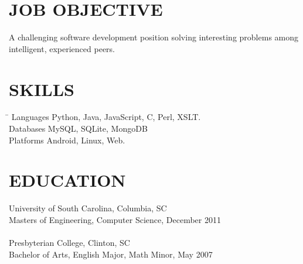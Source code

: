 \documentclass{res}
\begin{document}
 


\address{\bf  PRESENT ADDRESS\\832 NW 10th Ave.\\Gainesville, FL 32601}
\address{\bf PERMANENT ADDRESS \\ 1210 Fairview Dr.\\Columbia, SC 29205\\(803) 487-7247}
                                  
\begin{resume}

\section{JOB OBJECTIVE}          
    A challenging software development position solving interesting problems among intelligent, experienced peers. 
 
\section{SKILLS} 
   \vspace{-0.1in}	         
 \begin{tabbing}%
   \hspace{1.2in}\= \kill
    Languages \>Python, Java, JavaScript, C, Perl, XSLT. \\
    Databases \>MySQL, SQLite, MongoDB\\
    Platforms \>Android, Linux, Web.\\    
  \end{tabbing}
  \vspace{-0.3in}	 
  
\section{EDUCATION}          
    University of South Carolina, Columbia, SC  \\        
    Masters of Engineering, Computer Science, December 2011   \\       
    \\Presbyterian College, Clinton, SC\\
    Bachelor of Arts, English Major, Math Minor, May 2007

 

\end{resume}
\end{document}
